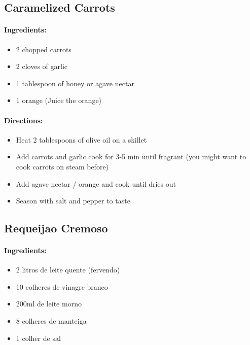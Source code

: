 \documentclass{article}
\begin{document}
\subsection{Caramelized Carrots}

\paragraph{Ingredients:}

\begin{itemize}
	\item 2 chopped carrots
	\item 2 cloves of garlic
	\item 1 tablespoon of honey or agave nectar
	\item 1 orange (Juice the orange)
\end{itemize}

\paragraph{Directions:}
\begin{itemize}
	\item  Heat 2 tablespoons of olive oil on a skillet
	\item Add carrots and garlic cook for 3-5 min until fragrant (you might want to cook carrots on steam before)
	\item Add agave nectar / orange and cook until dries out
	\item Season with salt and pepper to taste
\end{itemize}

\subsection{Requeijao Cremoso}

\paragraph{Ingredients:}

\begin{itemize}
	\item 2 litros de leite quente (fervendo)
	\item 10 colheres de vinagre branco
	\item 200ml de leite morno
	\item 8 colheres de manteiga
	\item 1 colher de sal
\end{itemize}
\end{document}
